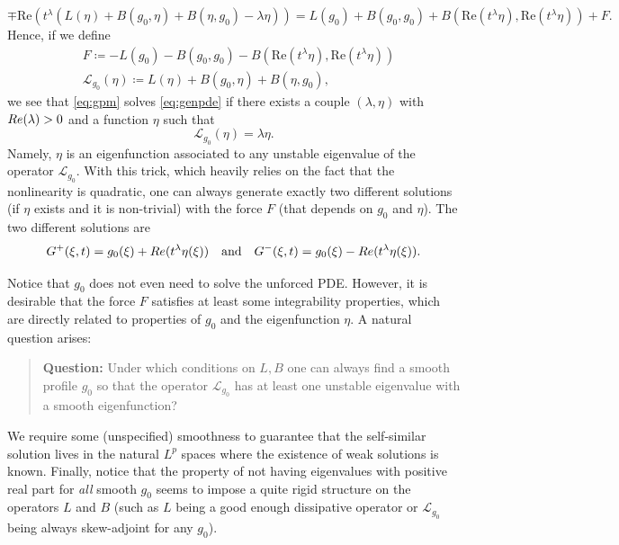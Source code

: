 \documentclass[11pt,reqno]{amsproc}
\def\de{{\partial}}
\def\Re{{\rm Re}}
\theoremstyle{definition}
\theoremstyle{definition}
\numberwithin{equation}{section}
\begin{document}
\begin{equation}
\mp\mathrm{Re}\left( t^\lambda(L(\eta)+B(g_0,\eta)+B(\eta,g_0)-\lambda \eta )\right)=L(g_0)+B(g_0,g_0)+B(\mathrm{Re}(t^\lambda\eta),\mathrm{Re}(t^\lambda\eta))+F.
\end{equation}
Hence, if we define 
\begin{align}
&F\coloneqq-L(g_0)-B(g_0,g_0)-B(\mathrm{Re}(t^\lambda\eta),\mathrm{Re}(t^\lambda\eta))\\
&\mathcal{L}_{g_0}(\eta)\coloneqq L(\eta)+B(g_0,\eta)+B(\eta,g_0),
\end{align}
we see that \cref{eq:gpm} solves \cref{eq:genpde} if there exists a couple $(\lambda,\eta)$ with $\Re(\lambda)>0$ and a function $\eta$ such that
\begin{equation}
    \mathcal{L}_{g_0}(\eta)=\lambda \eta.
\end{equation}
Namely, $\eta$ is an eigenfunction associated to any unstable eigenvalue of the operator $\mathcal{L}_{g_0}$. With this trick, which heavily relies on the fact that the nonlinearity is quadratic, one can always generate exactly two different solutions (if $\eta$ exists and it is non-trivial) with the force $F$ (that depends on $g_0$ and $\eta$). The two different solutions are \[
G^+(\xi,t)=g_0(\xi)+\Re(t^\lambda \eta(\xi)) \quad \text{and} \quad G^-(\xi,t)=g_0(\xi)-\Re(t^\lambda \eta(\xi)).\]

Notice that $g_0$ does not even need to solve the unforced PDE. However, it is desirable that the force $F$ satisfies at least some integrability properties, which are directly related to properties of  $g_0$ and the eigenfunction $\eta$. 
A natural question arises:
\begin{quote}
    \textbf{Question:} Under which conditions on $L,B$ one can always find a smooth profile $g_0$ so that the operator $\mathcal{L}_{g_0}$ has at least one unstable eigenvalue with a smooth eigenfunction?
\end{quote}
We require some (unspecified) smoothness to guarantee that the self-similar solution lives in the natural $L^p$ spaces where the existence of weak solutions is known. Finally, notice that the property of not having eigenvalues with positive real part for \emph{all} smooth $g_0$ seems to impose a quite rigid structure on the operators $L$ and $B$ (such as $L$ being a good enough dissipative operator  or $\mathcal{L}_{g_0}$ being always skew-adjoint for any $g_0$).



\end{document}
